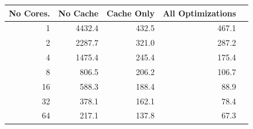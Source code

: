 \begin{table}[ht]
\centering
\label{my-label}
\begin{tabular}{|r|r|r|r|r|}
\hline
No Cores.   & No Cache & Cache Only & All Optimizations \\
\hline
1 & 4432.4 & 432.5 & 467.1 \\ \hline
2 & 2287.7 & 321.0 & 287.2 \\ \hline
4 & 1475.4 & 245.4 & 175.4 \\ \hline
8 & 806.5  & 206.2 & 106.7 \\ \hline
16 & 588.3  & 188.4 & 88.9  \\ \hline
32 & 378.1  & 162.1 & 78.4  \\ \hline
64 & 217.1  & 137.8 & 67.3    \\
\hline
\end{tabular}
\end{table}

